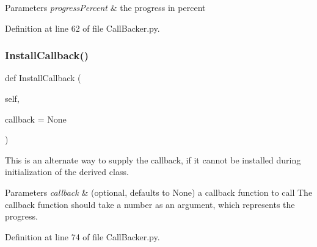 \begin{DoxyParams}{Parameters}
{\em progress\+Percent} & the progress in percent \\
\hline
\end{DoxyParams}


Definition at line 62 of file Call\+Backer.\+py.

\mbox{\label{classSignalIntegrity_1_1CallBacker_1_1CallBacker_a9307eb7d2258b5f1df8bfc5f43effcab}} 
\subsubsection{\texorpdfstring{Install\+Callback()}{InstallCallback()}}
{\footnotesize\ttfamily def Install\+Callback (\begin{DoxyParamCaption}\item[{}]{self,  }\item[{}]{callback = {\ttfamily None} }\end{DoxyParamCaption})}



This is an alternate way to supply the callback, if it cannot be installed during initialization of the derived class. 


\begin{DoxyParams}{Parameters}
{\em callback} & (optional, defaults to None) a callback function to call The callback function should take a number as an argument, which represents the progress. \\
\hline
\end{DoxyParams}


Definition at line 74 of file Call\+Backer.\+py.

\mbox{\label{classSignalIntegrity_1_1CallBacker_1_1CallBacker_ac93a2d2ea7a87653318147244b98b31c}} 
